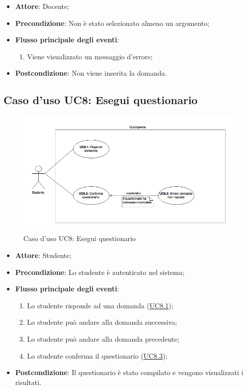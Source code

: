 \documentclass[12pt,a4paper]{article}
\begin{document}
\begin{itemize}

\item \textbf{Attore}: Docente; 
\item \textbf{Precondizione}: Non è stato selezionato almeno un argomento;

\item \textbf{Flusso principale degli eventi}:
\begin{enumerate}
	\item Viene visualizzato un messaggio d'errore;
	
\end{enumerate}
\item \textbf{Postcondizione}: Non viene inserita la domanda.
\end{itemize}
\hypertarget{UC8}{}
\subsection{Caso d'uso UC8: Esegui questionario}
\begin{figure}[H]
	\centering
	\includegraphics[width=\textwidth]{diagramUC8.png}
	\caption{Caso d'uso UC8: Esegui questionario}\label{fig:UC8} 
\end{figure}
\begin{itemize}

\item \textbf{Attore}: Studente; 
\item \textbf{Precondizione}: Lo studente è autenticato nel sistema;

\item \textbf{Flusso principale degli eventi}:
\begin{enumerate}
	\item Lo studente risponde ad una domanda (\hyperlink{UC8.1}{UC8.1});
	\item Lo studente può andare alla domanda successiva;
	\item Lo studente può andare alla domanda precedente;
	\item Lo studente conferma il questionario (\hyperlink{UC8.3}{UC8.3});
	
\end{enumerate}
\item \textbf{Postcondizione}: Il questionario è stato compilato e vengono visualizzati i risultati.
\end{itemize}
\hypertarget{UC8.1}{}
\end{document}
